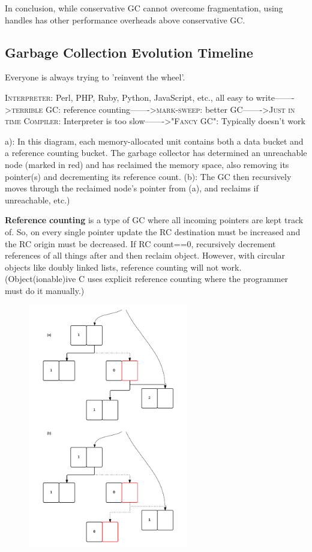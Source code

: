 \documentclass[twoside]{article}
\begin{document}
In conclusion, while conservative GC cannot overcome fragmentation, using handles has other performance overheads above conservative GC.
\subsection{Garbage Collection Evolution Timeline}
Everyone is always trying to 'reinvent the wheel'.
\begin{center}
\textsc{Interpreter}: {\scriptsize Perl, PHP, Ruby, Python, JavaScript, etc., all easy to write}-------\textgreater \textsc{terrible GC}: {\scriptsize reference counting}-------\textgreater \textsc{mark-sweep}: {\scriptsize better GC}-------\textgreater \textsc{Just in time Compiler}: {\scriptsize Interpreter is too slow}-------\textgreater \textsc{"Fancy GC"}: {\scriptsize Typically doesn't work}
\end{center}
\begin{scriptsize}
a): In this diagram, each memory-allocated unit contains both a data bucket and a reference counting bucket. The garbage collector has determined an unreachable node (marked in red) and has reclaimed the memory space, also removing its pointer(s) and decrementing its reference count. (b): The GC then recursively moves through the reclaimed node's pointer from (a), and reclaims if unreachable, etc.)\\
\end{scriptsize}


\textbf{Reference} \textbf{counting} is a type of GC where all incoming pointers are kept track of. So, on every single pointer update the RC destination must be increased and the RC origin must be decreased. If RC count==0, recursively decrement references of all things after and then reclaim object. However, with circular objects like doubly linked lists, reference counting will not work.(Object(ionable)ive C uses explicit reference counting where the programmer must do it manually.)
\begin{figure}
\centering
\includegraphics[width=70mm]{Original.png}
\end{figure}
\end{document}
